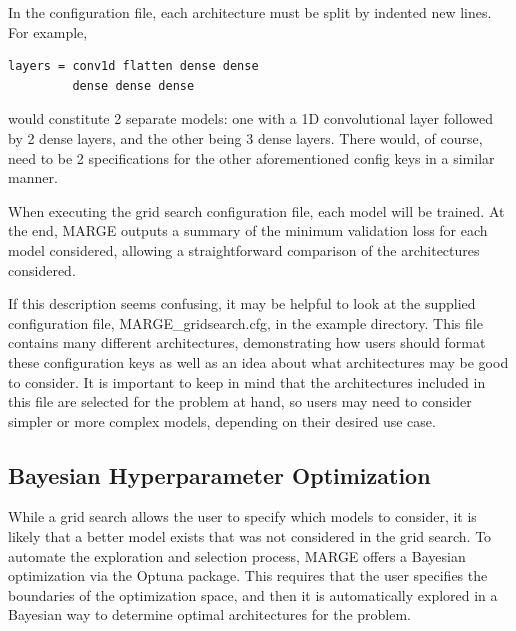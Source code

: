 \documentclass[letterpaper, 12pt]{article}
\begin{document}
\noindent In the configuration file, each architecture must be split by indented
new lines.  For example, 
\begin{verbatim}
layers = conv1d flatten dense dense
         dense dense dense
\end{verbatim}
\noindent would constitute 2 separate models: one with a 1D convolutional layer 
followed by 2 dense layers, and the other being 3 dense layers.  There would, 
of course, need to be 2 specifications for the other aforementioned config keys 
in a similar manner.\newline

\noindent When executing the grid search configuration file, each model will 
be trained.  At the end, MARGE outputs a summary of the minimum validation loss 
for each model considered, allowing a straightforward comparison of the 
architectures considered.\newline

\noindent If this description seems confusing, it may be helpful to look at 
the supplied configuration file, MARGE\_gridsearch.cfg, in the example directory.
This file contains many different architectures, demonstrating how users 
should format these configuration keys as well as an idea about what 
architectures may be good to consider.  It is important to keep in mind that 
the architectures included in this file are selected for the problem at hand, 
so users may need to consider simpler or more complex models, depending on 
their desired use case.


\subsection{Bayesian Hyperparameter Optimization}

While a grid search allows the user to specify which models to consider, it is 
likely that a better model exists that was not considered in the grid search.  
To automate the exploration and selection process, MARGE offers a Bayesian 
optimization via the Optuna package.  This requires that the user specifies the 
boundaries of the optimization space, and then it is automatically explored in 
a Bayesian way to determine optimal architectures for the problem.
\end{document}
